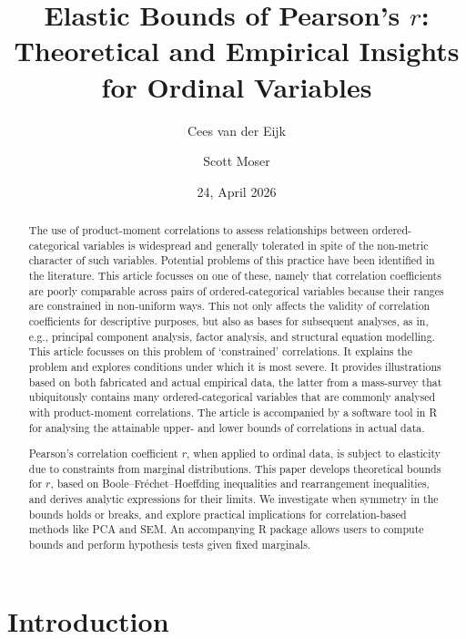 \documentclass[
  12pt,
]{article}
\title{Elastic Bounds of Pearson's \(r\): Theoretical and Empirical
Insights for Ordinal Variables}
\author{Cees van der Eijk \and Scott Moser}
\date{24, April 2026}
\theoremstyle{plain}
\theoremstyle{definition}
\renewcommand*\contentsname{Table of contents}
\newcommand\contentsname{Table of contents}
\theoremstyle{remark}
\begin{document}
\maketitle

\renewcommand*\contentsname{Table of contents}
{
\hypersetup{linkcolor=}
\setcounter{tocdepth}{3}
\tableofcontents
}

\newpage

\begin{abstract}
The use of product-moment correlations to assess relationships between ordered-categorical variables is widespread and generally tolerated in spite of the non-metric character of such variables. Potential problems of this practice have been identified in the literature. This article focusses on one of these, namely that correlation coefficients are poorly comparable across pairs of ordered-categorical variables because their ranges are constrained in non-uniform ways. This not only affects the validity of correlation coefficients for descriptive purposes, but also as bases for subsequent analyses, as in, e.g., principal component analysis, factor analysis, and structural equation modelling. This article focusses on this problem of ‘constrained’ correlations. It explains the problem and explores conditions under which it is most severe. It provides illustrations based on both fabricated and actual empirical data, the latter from a mass-survey that ubiquitously contains many ordered-categorical variables that are commonly analysed with product-moment correlations. The article is accompanied by a software tool in R for analysing the attainable upper- and lower bounds of correlations in actual data. 

Pearson’s correlation coefficient $r$, when applied to ordinal data, is subject to elasticity due to constraints from marginal distributions. This paper develops theoretical bounds for $r$, based on Boole–Fréchet–Hoeffding inequalities and rearrangement inequalities, and derives analytic expressions for their limits. We investigate when symmetry in the bounds holds or breaks, and explore practical implications for correlation-based methods like PCA and SEM. An accompanying R package allows users to compute bounds and perform hypothesis tests given fixed marginals.
\end{abstract}

\newpage

\newpage

\section{Introduction}\label{sec-intro}
\end{document}
